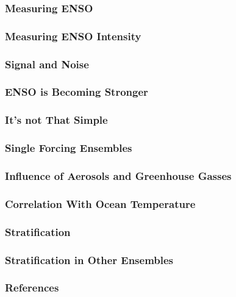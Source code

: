 \documentclass{beamer}
\begin{document}
\begin{frame}
  \frametitle{Measuring ENSO}

\end{frame}

\begin{frame}
  \frametitle{Measuring ENSO Intensity}

\end{frame}

\begin{frame}
  \frametitle{Signal and Noise}

\end{frame}

\begin{frame}
  \frametitle{ENSO is Becoming Stronger}

\end{frame}

\begin{frame}
  \frametitle{It's not That Simple}

\end{frame}

\begin{frame}
  \frametitle{Single Forcing Ensembles}

\end{frame}

\begin{frame}
  \frametitle{Influence of Aerosols and Greenhouse Gasses}

\end{frame}

\begin{frame}
  \frametitle{Correlation With Ocean Temperature}

\end{frame}

\begin{frame}
  \frametitle{Stratification}

\end{frame}

\begin{frame}
  \frametitle{Stratification in Other Ensembles}

\end{frame}

\begin{frame}
  \frametitle{References}
  
  
\end{frame}

\maketitle
\end{document}
